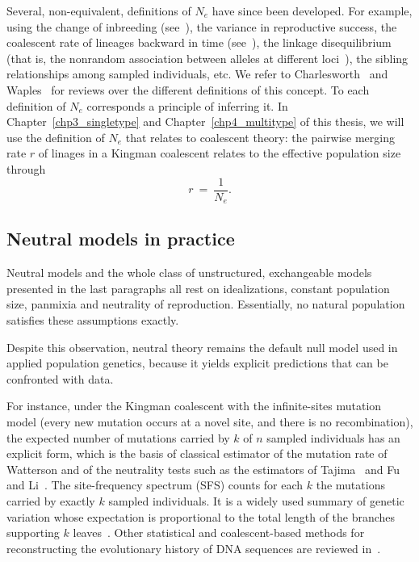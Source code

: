 Several, non-equivalent, definitions of $N_e$ have since been developed. 
For example, using the change of inbreeding (see~\citet{crow_inbreeding_1988}), the variance in reproductive success, 
the coalescent rate of lineages backward in time (see~\citet{Kingman:1982aa}), the linkage disequilibrium (that is, the nonrandom association between alleles at different loci~\cite{slatkin_linkage_2008}), the sibling relationships among sampled individuals, etc.
We refer to Charlesworth~\cite{charlesworth_effective_2009,charlesworth_how_2022} and Waples~\cite{waples_what_2022,waples_idiots_2025} for reviews over the different definitions of this concept. To each definition of $N_e$ corresponds a principle of inferring it.
In Chapter~\ref{chp3_singletype} and Chapter~\ref{chp4_multitype} of this thesis, we will use the definition of $N_e$ that relates to coalescent theory: the pairwise merging rate $r$ of linages in a Kingman coalescent relates to the effective population size through
\[
r\ =\ \frac{1}{N_e}.
\]

\subsection{Neutral models in practice}
Neutral models and the whole class of unstructured, exchangeable models presented in the last paragraphs all rest on idealizations, constant population size, panmixia and neutrality of reproduction. Essentially, no natural population satisfies these assumptions exactly.


Despite this observation, neutral theory remains the default null model used in applied population genetics, because it yields explicit predictions that can be confronted with data.

For instance, under the Kingman coalescent with the infinite-sites mutation model (every new mutation occurs at a novel site, and there is no recombination), the expected number of mutations carried by $k$ of $n$ sampled individuals has an explicit form, which is the basis of classical estimator of the mutation rate of Watterson and of the neutrality tests such as the estimators of Tajima~\cite{tajima_statistical_1989} and Fu and Li~\cite{Fu_Li_Neutrality_tests}.
The site-frequency spectrum (SFS) counts for each $k$ the mutations carried by exactly $k$ sampled individuals. It is a widely used summary of genetic variation whose expectation is proportional to the total length of the branches supporting $k$ leaves~\cite{wakeley_coalescent_2009}. Other statistical and coalescent-based methods for reconstructing the evolutionary history of DNA sequences are reviewed in~\citet{griffiths_ancestral_2001}.


